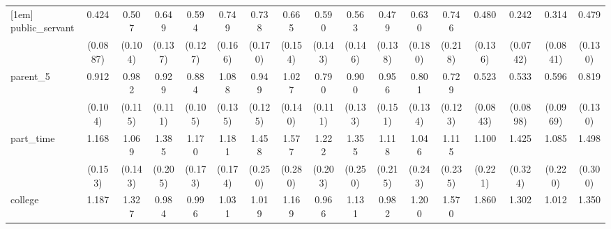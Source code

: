 {\begin{tabular}{l*{16}{c}}
[1em]
public\_servant      &       0.424\sym{***}&       0.507\sym{***}&       0.649\sym{*}  &       0.594\sym{*}  &       0.749         &       0.738         &       0.665         &       0.590\sym{*}  &       0.563\sym{*}  &       0.479\sym{*}  &       0.630         &       0.746         &       0.480\sym{**} &       0.242\sym{***}&       0.314\sym{***}&       0.479\sym{**} \\
                    &    (0.0887)         &     (0.104)         &     (0.137)         &     (0.127)         &     (0.166)         &     (0.170)         &     (0.154)         &     (0.143)         &     (0.146)         &     (0.138)         &     (0.180)         &     (0.218)         &     (0.136)         &    (0.0742)         &    (0.0841)         &     (0.130)         \\
[1em]
parent\_5            &       0.912         &       0.982         &       0.929         &       0.884         &       1.088         &       0.949         &       1.027         &       0.790         &       0.900         &       0.956         &       0.801         &       0.729         &       0.523\sym{***}&       0.533\sym{***}&       0.596\sym{**} &       0.819         \\
                    &     (0.104)         &     (0.115)         &     (0.111)         &     (0.105)         &     (0.135)         &     (0.125)         &     (0.140)         &     (0.111)         &     (0.133)         &     (0.151)         &     (0.134)         &     (0.123)         &    (0.0843)         &    (0.0898)         &    (0.0969)         &     (0.130)         \\
[1em]
part\_time           &       1.168         &       1.069         &       1.385\sym{*}  &       1.170         &       1.181         &       1.458\sym{*}  &       1.577\sym{*}  &       1.222         &       1.355         &       1.118         &       1.046         &       1.115         &       1.100         &       1.425         &       1.085         &       1.498\sym{*}  \\
                    &     (0.153)         &     (0.143)         &     (0.205)         &     (0.173)         &     (0.174)         &     (0.250)         &     (0.280)         &     (0.203)         &     (0.250)         &     (0.215)         &     (0.243)         &     (0.235)         &     (0.221)         &     (0.324)         &     (0.220)         &     (0.300)         \\
[1em]
college             &       1.187         &       1.327         &       0.984         &       0.996         &       1.031         &       1.019         &       1.169         &       0.966         &       1.131         &       0.982         &       1.200         &       1.570\sym{*}  &       1.860\sym{**} &       1.302         &       1.012         &       1.350         \\

\end{tabular}}
